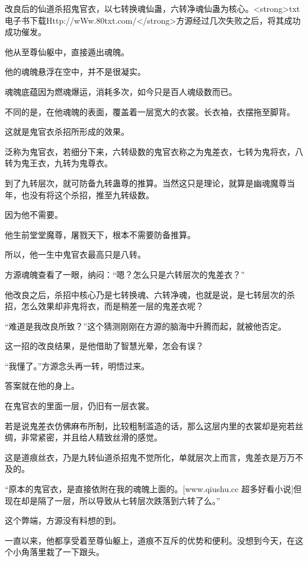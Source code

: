 
\begin{this_body}

改良后的仙道杀招鬼官衣，以七转换魂仙蛊，六转净魂仙蛊为核心。<strong>txt电子书下载Http://wWw.80txt.com/</strong>方源经过几次失败之后，将其成功成功催发。

他从至尊仙躯中，直接遁出魂魄。

他的魂魄悬浮在空中，并不是很凝实。

魂魄底蕴因为燃魂爆运，消耗多次，如今只是百人魂级数而已。

不同的是，在他魂魄的表面，覆盖着一层宽大的衣裳。长衣袖，衣摆拖至脚背。

这就是鬼官衣杀招所形成的效果。

泛称为鬼官衣，若细分下来，六转级数的鬼官衣称之为鬼差衣，七转为鬼将衣，八转为鬼王衣，九转为鬼尊衣。

到了九转层次，就可防备九转蛊尊的推算。当然这只是理论，就算是幽魂魔尊当年，也没有将这个杀招，推至九转级数。

因为他不需要。

他生前堂堂魔尊，屠戮天下，根本不需要防备推算。

所以，他一生中鬼官衣最高只是八转。

方源魂魄查看了一眼，纳闷：“嗯？怎么只是六转层次的鬼差衣？”

他改良之后，杀招中核心乃是七转换魂、六转净魂，也就是说，是七转层次的杀招，怎么效果却非鬼将衣，而是稍差一层的鬼差衣呢？

“难道是我改良所致？”这个猜测刚刚在方源的脑海中升腾而起，就被他否定。

这一招的改良结果，是他借助了智慧光晕，怎会有误？

“我懂了。”方源念头再一转，明悟过来。

答案就在他的身上。

在鬼官衣的里面一层，仍旧有一层衣裳。

若是说鬼差衣仿佛麻布所制，比较粗制滥造的话，那么这层内里的衣裳却是宛若丝绸，非常紧密，并且给人精致丝滑的感觉。

这是道痕丝衣，乃是九转仙道杀招鬼不觉所化，单就层次上而言，鬼差衣是万万不及的。

“原本的鬼官衣，是直接依附在我的魂魄上面的。[www.qiushu.cc 超多好看小说]但现在却是隔了一层，所以导致从七转层次跌落到六转了么。”

这个弊端，方源没有料想的到。

一直以来，他都享受着至尊仙躯上，道痕不互斥的优势和便利。没想到今天，在这个小角落里栽了一下跟头。


\end{this_body}
